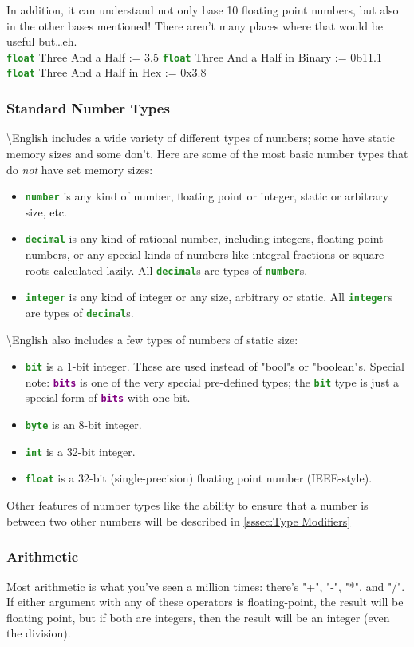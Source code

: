 \documentclass{article}
\newcommand{\English}{\textbackslash{}English}				%
\newcommand{\sssecl}[1]{\subsubsection{#1}\label{sssec:#1}}
\newcommand{\type}[1]{\texttt{\textcolor{ForestGreen}{\textbf{#1}}}}
\newcommand{\keyop}[1]{\texttt{\textcolor{Purple}{\textbf{#1}}}}
\newenvironment{code}[0]
{\ttfamily{}				%
\setlength\parindent{0cm}	%
~\\}
{\setlength\parindent{1cm}
~\\}
\begin{document}
\indent In addition, it can understand not only base 10 floating point numbers, but also in the other bases mentioned! There aren't many places where that would be useful but\ldots{}eh.
\begin{code}
\type{float} Three And a Half := 3.5
\type{float} Three And a Half in Binary := 0b11.1
\type{float} Three And a Half in Hex := 0x3.8
\end{code}

\sssecl{Standard Number Types}
\indent \English{} includes a wide variety of different types of numbers; some have static memory sizes and some don't. Here are some of the most basic number types that do \emph{not} have set memory sizes:
\begin{itemize}
	\item \type{number} is any kind of number, floating point or integer, static or arbitrary size, etc.
	\item \type{decimal} is any kind of rational number, including integers, floating-point numbers, or any special kinds of numbers like integral fractions or square roots calculated lazily. All \type{decimal}s are types of \type{number}s.
	\item \type{integer} is any kind of integer or any size, arbitrary or static. All \type{integer}s are types of \type{decimal}s.
\end{itemize}

\indent \English{} also includes a few types of numbers of static size:
\begin{itemize}
	\item \type{bit} is a 1-bit integer. These are used instead of "bool"s or "boolean"s. Special note: \keyop{bits} is one of the very special pre-defined types; the \type{bit} type is just a special form of \keyop{bits} with one bit.
	\item \type{byte} is an 8-bit integer.
	\item \type{int} is a 32-bit integer.
	\item \type{float} is a 32-bit (single-precision) floating point number (IEEE-style).
\end{itemize}

\indent Other features of number types like the ability to ensure that a number is between two other numbers will be described in \ref{sssec:Type Modifiers}

\sssecl{Arithmetic}
\indent Most arithmetic is what you've seen a million times: there's "+", "-", "*", and "/". If either argument with any of these operators is floating-point, the result will be floating point, but if both are integers, then the result will be an integer (even the division).
\end{document}
